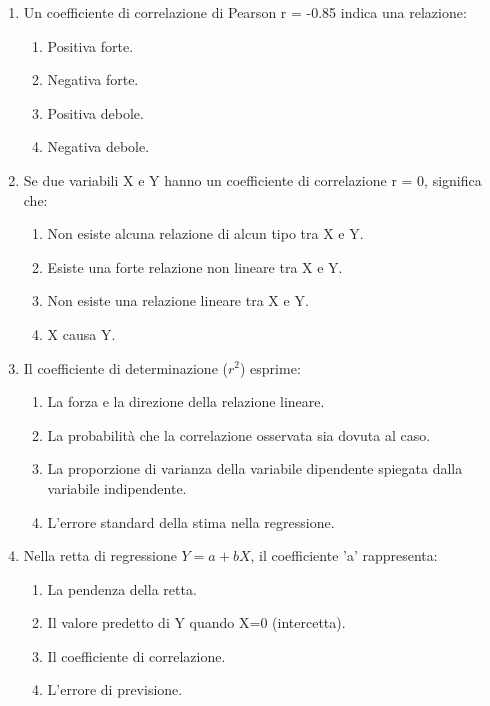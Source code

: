 \documentclass[12pt, a4paper]{article}
\begin{document}
\begin{enumerate}[resume]
    \item Un coefficiente di correlazione di Pearson r = -0.85 indica una relazione:
    \begin{enumerate}
        \item Positiva forte.
        \item Negativa forte.
        \item Positiva debole.
        \item Negativa debole.
    \end{enumerate}
    \vspace{0.3cm}

    \item Se due variabili X e Y hanno un coefficiente di correlazione r = 0, significa che:
    \begin{enumerate}
        \item Non esiste alcuna relazione di alcun tipo tra X e Y.
        \item Esiste una forte relazione non lineare tra X e Y.
        \item Non esiste una relazione lineare tra X e Y.
        \item X causa Y.
    \end{enumerate}
    \vspace{0.3cm}

    \item Il coefficiente di determinazione ($r^2$) esprime:
    \begin{enumerate}
        \item La forza e la direzione della relazione lineare.
        \item La probabilità che la correlazione osservata sia dovuta al caso.
        \item La proporzione di varianza della variabile dipendente spiegata dalla variabile indipendente.
        \item L'errore standard della stima nella regressione.
    \end{enumerate}
    \vspace{0.3cm}

    \item Nella retta di regressione $Y = a + bX$, il coefficiente 'a' rappresenta:
    \begin{enumerate}
        \item La pendenza della retta.
        \item Il valore predetto di Y quando X=0 (intercetta).
        \item Il coefficiente di correlazione.
        \item L'errore di previsione.
    \end{enumerate}
    \vspace{0.3cm}


\end{enumerate}
\end{document}
